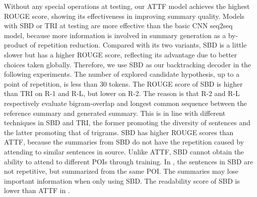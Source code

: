 \DIFdelend Without any special operations at testing, 
our ATTF model achieves the highest ROUGE score, showing
its effectiveness in improving summary quality.
Models with SBD or TRI at testing
are more effective than the basic CNN seq2seq model,
because more information is involved in summary generation 
as a by-product of repetition reduction.
Compared with its two variants, SBD is a little slower 
but has a higher ROUGE score, reflecting its advantage due to
better choices taken globally.
Therefore, 
we use SBD as our backtracking decoder in the following experiments. 
The number of explored candidate hypothesis, up to a point of
repetition, is less than 30 tokens.
The ROUGE score of SBD is higher than TRI on R-1 and R-L, but lower on R-2. 
The reason is that R-2 and R-L respectively evaluate
bigram-overlap and longest common sequence between the reference
summary and generated summary. This is in line with different techniques 
in SBD and TRI, the former promoting the diversity of sentences and 
the latter promoting that of trigrams.
SBD has higher ROUGE scores than ATTF, 
because the summaries from
SBD do not have the repetition caused by attending to similar sentences in source.
Unlike ATTF, 
SBD cannot obtain the ability to attend to different POIs through training.
In , the sentences in SBD are not repetitive, 
but summarized from the same POI.
The summaries may lose important information when only using SBD.
The readability score of SBD is lower than ATTF in .

